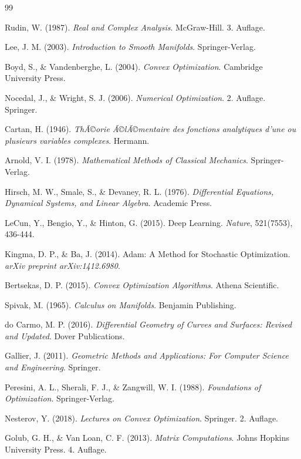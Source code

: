 ﻿\documentclass[a4paper,12pt]{article}
\theoremstyle{definition}
\begin{document}
\begin{thebibliography}{99}

Rudin, W. (1987). \textit{Real and Complex Analysis}. McGraw-Hill. 3. Auflage.

Lee, J. M. (2003). \textit{Introduction to Smooth Manifolds}. Springer-Verlag.

Boyd, S., \& Vandenberghe, L. (2004). \textit{Convex Optimization}. Cambridge University Press.

Nocedal, J., \& Wright, S. J. (2006). \textit{Numerical Optimization}. 2. Auflage. Springer.

Cartan, H. (1946). \textit{ThÃ©orie Ã©lÃ©mentaire des fonctions analytiques d'une ou plusieurs variables complexes}. Hermann.

Arnold, V. I. (1978). \textit{Mathematical Methods of Classical Mechanics}. Springer-Verlag.

Hirsch, M. W., Smale, S., \& Devaney, R. L. (1976). \textit{Differential Equations, Dynamical Systems, and Linear Algebra}. Academic Press.

LeCun, Y., Bengio, Y., \& Hinton, G. (2015). Deep Learning. \textit{Nature}, 521(7553), 436-444.

Kingma, D. P., \& Ba, J. (2014). Adam: A Method for Stochastic Optimization. \textit{arXiv preprint arXiv:1412.6980}.

Bertsekas, D. P. (2015). \textit{Convex Optimization Algorithms}. Athena Scientific.

Spivak, M. (1965). \textit{Calculus on Manifolds}. Benjamin Publishing.

do Carmo, M. P. (2016). \textit{Differential Geometry of Curves and Surfaces: Revised and Updated}. Dover Publications.

Gallier, J. (2011). \textit{Geometric Methods and Applications: For Computer Science and Engineering}. Springer.

Peresini, A. L., Sherali, F. J., \& Zangwill, W. I. (1988). \textit{Foundations of Optimization}. Springer-Verlag.

Nesterov, Y. (2018). \textit{Lectures on Convex Optimization}. Springer. 2. Auflage.

Golub, G. H., \& Van Loan, C. F. (2013). \textit{Matrix Computations}. Johns Hopkins University Press. 4. Auflage.


\end{thebibliography}
\end{document}
